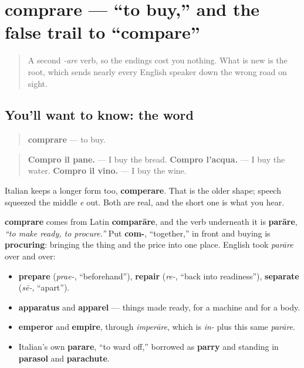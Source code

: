 \section[comprare]{comprare — \textquotedblleft{}to buy,\textquotedblright{} and the false trail to \textquotedblleft{}compare\textquotedblright{}}

\label{lesson:IT-C20-comprare}



\begin{quote}
A second \emph{-are} verb, so the endings cost you nothing. What is new is the root, which sends nearly every English speaker down the wrong road on sight.
\end{quote}

\subsection*{You'll want to know: the word}
\begin{quote}
\textbf{comprare} — to buy.
\end{quote}

\begin{quote}
\textbf{Compro il pane.} — I buy the bread. \textbf{Compro l'acqua.} — I buy the water. \textbf{Compro il vino.} — I buy the wine.
\end{quote}

Italian keeps a longer form too, \textbf{comperare}. That is the older shape; speech squeezed the middle \emph{e} out. Both are real, and the short one is what you hear.

\begin{cousinweb}
\textbf{comprare} comes from Latin \textbf{comparāre}, and the verb underneath it is \textbf{parāre}, \emph{\textquotedblleft{}to make ready, to procure.\textquotedblright{}} Put \textbf{com-}, \textquotedblleft{}together,\textquotedblright{} in front and buying is \textbf{procuring}: bringing the thing and the price into one place. English took \emph{parāre} over and over:

\begin{itemize}
\raggedright
  \item \textbf{prepare} (\emph{prae-}, \textquotedblleft{}beforehand\textquotedblright{}), \textbf{repair} (\emph{re-}, \textquotedblleft{}back into readiness\textquotedblright{}), \textbf{separate} (\emph{sē-}, \textquotedblleft{}apart\textquotedblright{}).
  \item \textbf{apparatus} and \textbf{apparel} — things made ready, for a machine and for a body.
  \item \textbf{emperor} and \textbf{empire}, through \emph{imperāre}, which is \emph{in-} plus this same \emph{parāre}.
  \item Italian's own \textbf{parare}, \textquotedblleft{}to ward off,\textquotedblright{} borrowed as \textbf{parry} and standing in \textbf{parasol} and \textbf{parachute}.
\end{itemize}
\end{cousinweb}

